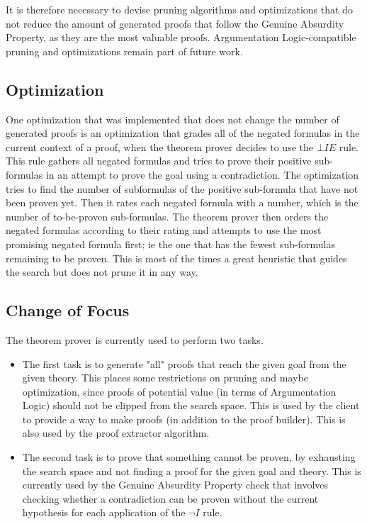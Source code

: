 \documentclass[11pt,twoside,a4paper]{report}
\begin{document}
It is therefore necessary to devise pruning algorithms and optimizations that do not reduce the amount of generated proofs that follow the Genuine Absurdity Property, as they are the most valuable proofs. Argumentation Logic-compatible pruning and optimizations remain part of future work.

\subsection{Optimization}
\label{subsec:optimus}
One optimization that was implemented that does not change the number of generated proofs is an optimization that grades all of the negated formulas in the current context of a proof, when the theorem prover decides to use the $\bot IE$ rule. This rule gathers all negated formulas and tries to prove their positive sub-formulas in an attempt to prove the goal using a contradiction. The optimization tries to find the number of subformulas of the positive sub-formula that have not been proven yet. Then it rates each negated formula with a number, which is the number of to-be-proven sub-formulas. The theorem prover then orders the negated formulas according to their rating and attempts to use the most promising negated formula first; ie the one that has the fewest sub-formulas remaining to be proven. This is most of the times a great heuristic that guides the search but does not prune it in any way. 

\subsection{Change of Focus}
The theorem prover is currently used to perform two tasks. 

\begin{itemize}
\item
The first task is to generate "all" proofs that reach the given goal from the given theory. This places some restrictions on pruning and maybe optimization, since proofs of potential value (in terms of Argumentation Logic) should not be clipped from the search space. This is used by the client to provide a way to make proofs (in addition to the proof builder). This is also used by the proof extractor algorithm.
\item
The second task is to prove that something cannot be proven, by exhausting the search space and not finding a proof for the given goal and theory. This is currently used by the Genuine Absurdity Property check that involves checking whether a contradiction can be proven without the current hypothesis for each application of the $\neg I$ rule.
\end{itemize}
\end{document}
